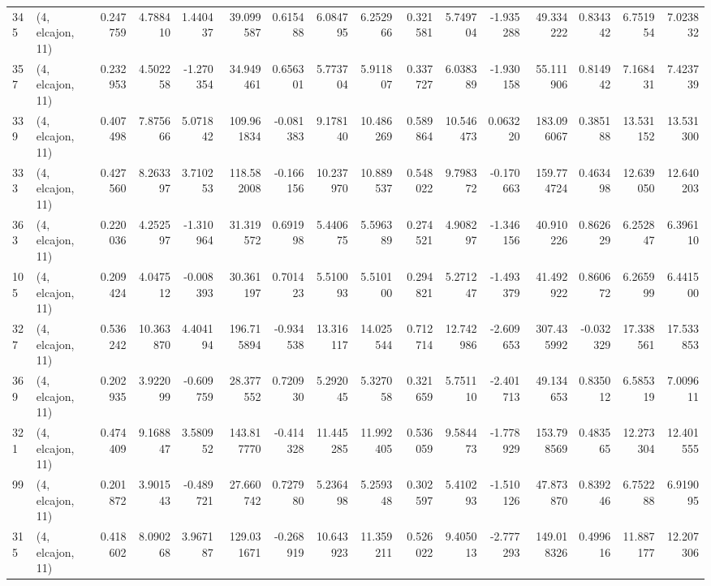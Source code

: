 \begin{tabular}{llrrrrrrrrrrrrrr}
345 &  (4, elcajon, 11) &   0.247759 &   4.788410 &   1.440437 &    39.099587 &   0.615488 &   6.084795 &   6.252966 &  0.321581 &   5.749704 &  -1.935288 &     49.334222 &    0.834342 &    6.751954 &    7.023832 \\
357 &  (4, elcajon, 11) &   0.232953 &   4.502258 &  -1.270354 &    34.949461 &   0.656301 &   5.773704 &   5.911807 &  0.337727 &   6.038389 &  -1.930158 &     55.111906 &    0.814942 &    7.168431 &    7.423739 \\
339 &  (4, elcajon, 11) &   0.407498 &   7.875666 &   5.071842 &   109.961834 &  -0.081383 &   9.178140 &  10.486269 &  0.589864 &  10.546473 &   0.063220 &    183.096067 &    0.385188 &   13.531152 &   13.531300 \\
333 &  (4, elcajon, 11) &   0.427560 &   8.263397 &   3.710253 &   118.582008 &  -0.166156 &  10.237970 &  10.889537 &  0.548022 &   9.798372 &  -0.170663 &    159.774724 &    0.463498 &   12.639050 &   12.640203 \\
363 &  (4, elcajon, 11) &   0.220036 &   4.252597 &  -1.310964 &    31.319572 &   0.691998 &   5.440675 &   5.596389 &  0.274521 &   4.908297 &  -1.346156 &     40.910226 &    0.862629 &    6.252847 &    6.396110 \\
105 &  (4, elcajon, 11) &   0.209424 &   4.047512 &  -0.008393 &    30.361197 &   0.701423 &   5.510093 &   5.510100 &  0.294821 &   5.271247 &  -1.493379 &     41.492922 &    0.860672 &    6.265999 &    6.441500 \\
327 &  (4, elcajon, 11) &   0.536242 &  10.363870 &   4.404194 &   196.715894 &  -0.934538 &  13.316117 &  14.025544 &  0.712714 &  12.742986 &  -2.609653 &    307.435992 &   -0.032329 &   17.338561 &   17.533853 \\
369 &  (4, elcajon, 11) &   0.202935 &   3.922099 &  -0.609759 &    28.377552 &   0.720930 &   5.292045 &   5.327058 &  0.321659 &   5.751110 &  -2.401713 &     49.134653 &    0.835012 &    6.585319 &    7.009611 \\
321 &  (4, elcajon, 11) &   0.474409 &   9.168847 &   3.580952 &   143.817770 &  -0.414328 &  11.445285 &  11.992405 &  0.536059 &   9.584473 &  -1.778929 &    153.798569 &    0.483565 &   12.273304 &   12.401555 \\
99  &  (4, elcajon, 11) &   0.201872 &   3.901543 &  -0.489721 &    27.660742 &   0.727980 &   5.236498 &   5.259348 &  0.302597 &   5.410293 &  -1.510126 &     47.873870 &    0.839246 &    6.752288 &    6.919095 \\
315 &  (4, elcajon, 11) &   0.418602 &   8.090268 &   3.967187 &   129.031671 &  -0.268919 &  10.643923 &  11.359211 &  0.526022 &   9.405013 &  -2.777293 &    149.018326 &    0.499616 &   11.887177 &   12.207306 \\

\end{tabular}

